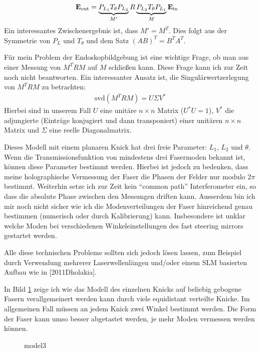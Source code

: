 \documentclass{article}
\begin{document}
\begin{align}
  {\bf E_\textrm{out}} &=  \underbrace{P_{L_1} T_\theta P_{L_2}}_{M'} R  \underbrace{P_{L_2} T_\theta P_{L_1}}_M  {\bf E_\textrm{in}}
\end{align}
Ein interessantes Zwischenergebnis ist, dass $M'=M^T$. Dies
folgt aus der Symmetrie von $P_L$ und $T_\theta$ und dem Satz
$(AB)^T=B^TA^T$.

F\"ur mein Problem der Endoskopbildgebung ist eine wichtige Frage, ob
man aus einer Messung von $M^TRM$ auf $M$ schlie\ss en kann. Diese
Frage kann ich zur Zeit noch nicht beantworten. Ein interessanter
Ansatz ist, die Singul\"arwertzerlegung von $M^TRM$ zu betrachten:
\begin{align}
  \textrm{svd}(M^TRM) = U \Sigma V^*
\end{align}
Hierbei sind in unserem Fall $U$ eine unit\"are $n\times n$ Matrix
($U^*U=1$), $V^*$ die adjungierte (Eintr\"age konjugiert und dann
transponiert) einer unit\"aren $n\times n$ Matrix und $\Sigma$ eine
reelle Diagonalmatrix.

 
Dieses Modell mit einem planaren Knick hat drei freie Parameter:
$L_1$, $L_2$ und $\theta$. Wenn die Transmissionsfunktion von
mindestens drei Fasermoden bekannt ist, k\"onnen diese Parameter
bestimmt werden. Hierbei ist jedoch zu bedenken, dass meine
holographische Vermessung der Faser die Phasen der Felder nur modulo
$2\pi$ bestimmt. Weiterhin setze ich zur Zeit kein ``common path''
Interferometer ein, so dass die absolute Phase zwischen den Messungen
driften kann. Ausserdem bin ich mir noch nicht sicher wie ich die
Modenverteilungen der Faser hinreichend genau bestimmen (numerisch
oder durch Kalibrierung) kann. Insbesondere ist unklar welche Moden
bei verschiedenen Winkeleinstellungen des fast steering mirrors
gestartet werden.

Alle diese technischen Probleme sollten sich jedoch l\"osen lassen,
zum Beispiel durch Verwendung mehrerer Laserwellenl\"angen und/oder
einem SLM basierten Aufbau wie in [2011Dholakia].

In Bild \ref{fig:model3} zeige ich wie das Modell des einzelnen Knicks
auf beliebig gebogene Fasern verallgemeinert werden kann durch viele
equidistant verteilte Knicke. Im allgemeinen Fall m\"ussen an jedem
Knick zwei Winkel bestimmt werden. Die Form der Faser kann umso besser
abgetastet werden, je mehr Moden vermessen werden k\"onnen.


\begin{figure}[htbp]
  \centering
  
  \caption{model3}
  \label{fig:model3}
\end{figure}
\end{document}
